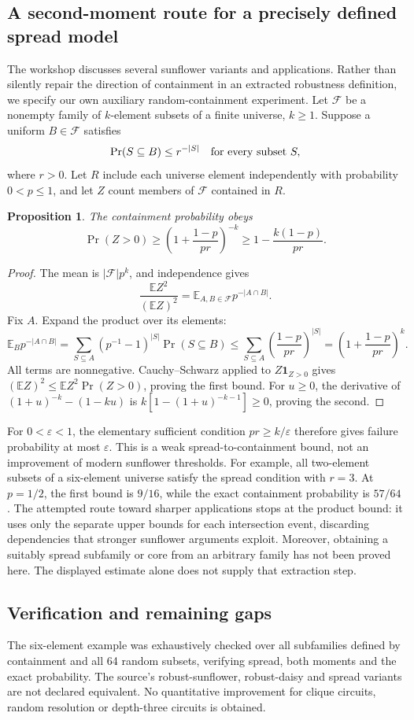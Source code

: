 \documentclass[11pt]{article}
\newtheorem{proposition}{Proposition}
\begin{document}
\subsection{A second-moment route for a precisely defined spread model}
The workshop discusses several sunflower variants and applications. Rather than silently repair the direction of containment in an extracted robustness definition, we specify our own auxiliary random-containment experiment. Let $\mathcal F$ be a nonempty family of $k$-element subsets of a finite universe, $k\ge1$. Suppose a uniform $B\in\mathcal F$ satisfies
\[
\Pr(S\subseteq B)\le r^{-|S|}\quad\hbox{for every subset }S,
\]
where $r>0$. Let $R$ include each universe element independently with probability $0<p\le1$, and let $Z$ count members of $\mathcal F$ contained in $R$.
\begin{proposition}
The containment probability obeys
\[
\Pr(Z>0)\ge\left(1+\frac{1-p}{pr}\right)^{-k}
\ge 1-\frac{k(1-p)}{pr}.
\]
\end{proposition}
\begin{proof}
The mean is $|\mathcal F|p^k$, and independence gives
\[
\frac{\mathbb EZ^2}{(\mathbb EZ)^2}
=\mathbb E_{A,B\in\mathcal F}p^{-|A\cap B|}.
\]
Fix $A$. Expand the product over its elements:
\[
\mathbb E_B p^{-|A\cap B|}
=\sum_{S\subseteq A}(p^{-1}-1)^{|S|}\Pr(S\subseteq B)
\le\sum_{S\subseteq A}\left(\frac{1-p}{pr}\right)^{|S|}
=\left(1+\frac{1-p}{pr}\right)^k.
\]
All terms are nonnegative. Cauchy--Schwarz applied to $Z\mathbf1_{Z>0}$ gives $(\mathbb EZ)^2\le\mathbb EZ^2\Pr(Z>0)$, proving the first bound. For $u\ge0$, the derivative of $(1+u)^{-k}-(1-ku)$ is $k[1-(1+u)^{-k-1}]\ge0$, proving the second.
\end{proof}
For $0<\varepsilon<1$, the elementary sufficient condition $pr\ge k/\varepsilon$ therefore gives failure probability at most $\varepsilon$. This is a weak spread-to-containment bound, not an improvement of modern sunflower thresholds. For example, all two-element subsets of a six-element universe satisfy the spread condition with $r=3$. At $p=1/2$, the first bound is $9/16$, while the exact containment probability is $57/64$.
The attempted route toward sharper applications stops at the product bound: it uses only the separate upper bounds for each intersection event, discarding dependencies that stronger sunflower arguments exploit. Moreover, obtaining a suitably spread subfamily or core from an arbitrary family has not been proved here. The displayed estimate alone does not supply that extraction step.
\subsection{Verification and remaining gaps}
The six-element example was exhaustively checked over all subfamilies defined by containment and all 64 random subsets, verifying spread, both moments and the exact probability. The source's robust-sunflower, robust-daisy and spread variants are not declared equivalent. No quantitative improvement for clique circuits, random resolution or depth-three circuits is obtained.
\end{document}
